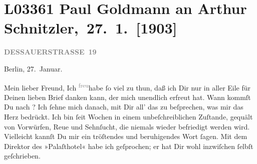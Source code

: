 

\section[ Paul Goldmann an Arthur Schnitzler, 27. 1. {[}1903{]}]{L03361 Paul Goldmann an Arthur Schnitzler, 27. 1. {[}1903{]}}
\nopagebreak{}
\rehead{ }\normalsize\beginnumbering{}
\toendnotes[C]{\smallbreak\pagebreak[2]}
\toendnotes[C]{\smallbreak}
\pstart
           \raggedleft{}{\pb}\textcolor{gray}{\textbf{DESSAUERSTRASSE 19}}\pend
           
\pstart
           Berlin, 27. Januar.\pend
           
\pstart\center{}Mein lieber Freund,\pend\vspace{0.5em}
\pstart
           Ich \substVorne{}\textsuperscript{\textcolor{gray}{freu}}\substDazwischen{}habe\substHinten{} ſo viel zu thun, daß ich Dir nur in aller Eile für Deinen lieben Brief
               danken kann, der mich unendlich erfreut hat. Wann kommſt Du nach \label{K_L03361-1v}\label{K_L03361-1}? Ich ſehne mich danach, mit
               Dir all’ das zu beſprechen, was mir das Herz bedrückt. Ich bin ſeit Wochen in einem
               unbeſchreiblichen Zuſtande, gequält von Vorwürfen, Reue und Sehnſucht, die niemals
                  {\pb}wieder befriedigt werden wird. Vielleicht kannſt
               Du mir ein tröſtendes und beruhigendes Wort ſagen. Mit dem Direktor des »Palaſthotel« habe ich geſprochen; er hat Dir wohl inzwiſchen
               ſelbſt geſchrieben.\pend
           

